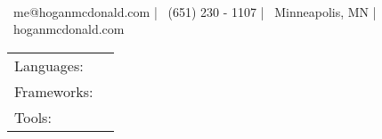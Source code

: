 \documentclass[]{awesome-cv}
\begin{document}
\begin{center}
	  \\
	\vspace{2mm}
	{\faEnvelope\ me@hoganmcdonald.com} | {\faMobile\ (651) 230 - 1107} | {\faMapMarker\ Minneapolis, MN} | {\faLink\ hoganmcdonald.com}
\end{center}
\begin{cventries}
	\cventry
	{}
	{\def\arraystretch{1.15}{\begin{tabular}{ l l }
		Languages:  & {\skill{ JavaScript, Python, Java, SQL, Shopify/Liquid, SASS, CSS, HTML}} \\
		Frameworks:  & {\skill{ React, AngularJs, React Native, Node.js, Express, PostgreSQL, MongoDB, TensorFlow, Keras, Numpy}} \\
		Tools:  & {\skill{ Git + Github, Webpack, Gulp, IntelliJ, PyCharm, Postman, GitLab}} \\
		\end{tabular}}}
	{}
	{}
	{}
\end{cventries}
\end{document}
